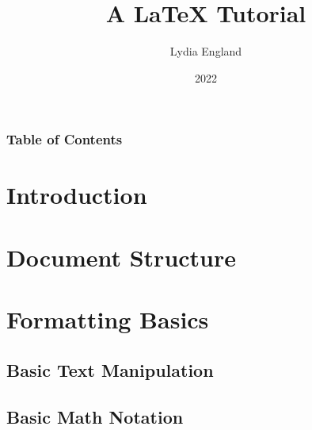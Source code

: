 \documentclass{beamer}
\title{A \LaTeX{} Tutorial}
\author{Lydia England}
\date{2022}
\begin{document}
\begin{frame}
\titlepage
\end{frame}

\begin{frame}
    \frametitle{Table of Contents}
	\tableofcontents[hideallsubsections]
\end{frame}

\section{Introduction}



\section{Document Structure}





\section{Formatting Basics}

\subsection{Basic Text Manipulation}


\subsection{Basic Math Notation}





\end{document}
